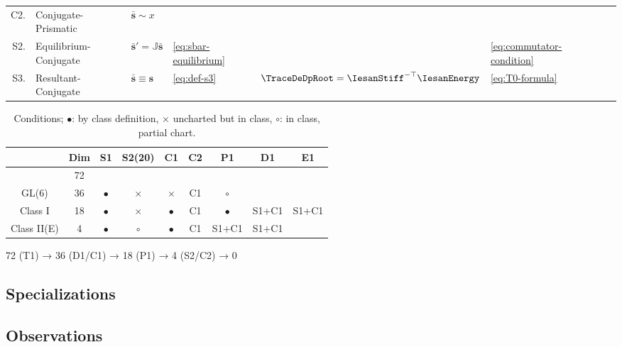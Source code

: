 \begin{table}[H]
\begin{tabular}{@{}rl|ll|llll@{}}
    C2. 
    & Conjugate-Prismatic 
    & $\bar{\bm{s}} \sim x$
    &
    &
    \\ 
    S2.
    & Equilibrium-Conjugate 
    & $\bar{\bm{s}}' = \mathbb{J}\bar{\bm{s}}$
    & \eqref{eq:sbar-equilibrium} 
    & %
    & \eqref{eq:commutator-condition}
    \\ 
    \hline
    S3.
    & Resultant-Conjugate 
    & $\bar{\bm{s}} \equiv {\bm{s}}$ 
    & \eqref{eq:def-s3}
    & $\TraceDeDpRoot = \IesanStiff^{-\top} \IesanEnergy$
    & \eqref{eq:T0-formula}
    \\
    \bottomrule
\end{tabular}
\end{table}

\begin{table}[H]
    \centering
    \caption{Conditions; \(\bullet\): by class definition, \(\times\) uncharted but in class, \(\circ\): in class, partial chart.}
    \begin{tabular}{c|c|cc|cc|ccc}
             & Dim & S1 & S2(20) & C1 & C2 & P1 & D1 & E1 \\ \hline
             & 72 & \\
    GL(6)    & 36 & $\bullet$ & $\times$ & $\times$ & C1 & $\circ$ \\
    Class I  & 18 & $\bullet$ & $\times$ & $\bullet$ & C1 & $\bullet$ & S1+C1 & S1+C1 \\
    Class II(E) &  4 & $\bullet$ & $\circ$ & $\bullet$ & C1 & S1+C1 & S1+C1
    \end{tabular}
\end{table}

72 (T1) → 36 (D1/C1) → 18 (P1) → 4 (S2/C2) → 0



\subsection{Specializations}


\subsection{Observations}

